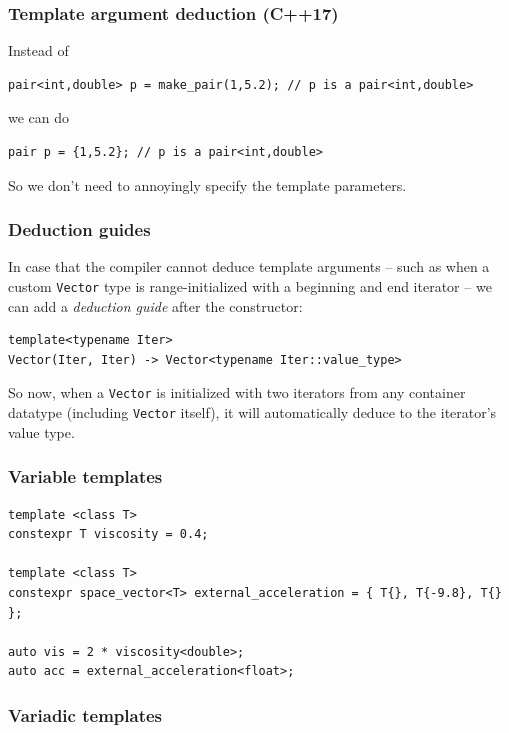 \documentclass[table, xcdraw]{article}%
\begin{document}
\subsubsection{Template argument deduction (C++17)}

Instead of

\begin{verbatim}
pair<int,double> p = make_pair(1,5.2); // p is a pair<int,double>
\end{verbatim}

we can do

\begin{verbatim}
pair p = {1,5.2}; // p is a pair<int,double>
\end{verbatim}

So we don't need to annoyingly specify the template parameters.

\subsubsection{Deduction guides}

In case that the compiler cannot deduce template arguments -- such as when a custom \texttt{Vector} type is range-initialized with a beginning and end iterator -- we can add a \emph{deduction guide} after the constructor:

\begin{verbatim}
template<typename Iter>
Vector(Iter, Iter) -> Vector<typename Iter::value_type>
\end{verbatim}

So now, when a \texttt{Vector} is initialized with two iterators from any container datatype (including \texttt{Vector} itself), it will automatically deduce to the iterator's value type.

\subsubsection{Variable templates}

\begin{verbatim}
template <class T>
constexpr T viscosity = 0.4;

template <class T>
constexpr space_vector<T> external_acceleration = { T{}, T{-9.8}, T{} };

auto vis = 2 * viscosity<double>;
auto acc = external_acceleration<float>;
\end{verbatim}

\subsubsection{Variadic templates} \label{variadictemplates}
\end{document}
